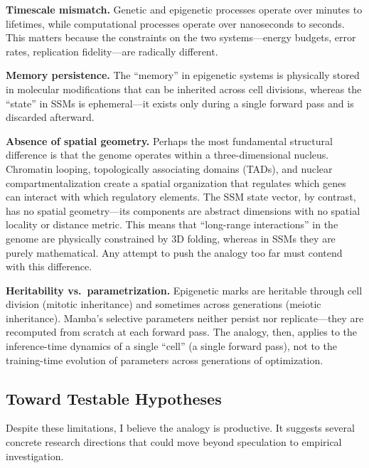 \documentclass[12pt,a4paper]{article}
\begin{document}
\textbf{Timescale mismatch.} Genetic and epigenetic processes operate over minutes to lifetimes, while computational processes operate over nanoseconds to seconds. This matters because the constraints on the two systems---energy budgets, error rates, replication fidelity---are radically different.

\textbf{Memory persistence.} The ``memory'' in epigenetic systems is physically stored in molecular modifications that can be inherited across cell divisions, whereas the ``state'' in SSMs is ephemeral---it exists only during a single forward pass and is discarded afterward.

\textbf{Absence of spatial geometry.} Perhaps the most fundamental structural difference is that the genome operates within a three-dimensional nucleus. Chromatin looping, topologically associating domains (TADs), and nuclear compartmentalization create a spatial organization that regulates which genes can interact with which regulatory elements. The SSM state vector, by contrast, has no spatial geometry---its components are abstract dimensions with no spatial locality or distance metric. This means that ``long-range interactions'' in the genome are physically constrained by 3D folding, whereas in SSMs they are purely mathematical. Any attempt to push the analogy too far must contend with this difference.

\textbf{Heritability vs.\ parametrization.} Epigenetic marks are heritable through cell division (mitotic inheritance) and sometimes across generations (meiotic inheritance). Mamba's selective parameters neither persist nor replicate---they are recomputed from scratch at each forward pass. The analogy, then, applies to the inference-time dynamics of a single ``cell'' (a single forward pass), not to the training-time evolution of parameters across generations of optimization.

\subsection{Toward Testable Hypotheses}
\label{sec:hypotheses}

Despite these limitations, I believe the analogy is productive. It suggests several concrete research directions that could move beyond speculation to empirical investigation.
\end{document}
